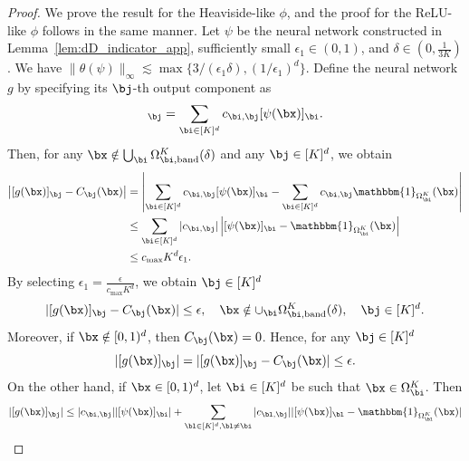 \documentclass[11pt]{article}
\begin{document}
\begin{proof}
     We prove the result for the Heaviside-like $\phi$, and the proof for the ReLU-like $\phi$ follows in the same manner. Let $\psi$ be the neural network constructed in Lemma~\ref{lem:dD_indicator_app}, sufficiently small $\epsilon_{1} \in (0,1)$, and $\delta \in (0,\tfrac{1}{3K})$. We have $\|\theta(\psi)\|_{\infty}\lesssim \max \{3 /(\epsilon_1\delta), (1/ \epsilon_1)^d\}$.
     Define the neural network $g$ by specifying its $\bj$-th output component as
    \begin{equation*}
        [g(\bx)]_{\bj} = \sum_{\bi \in [K]^d} c_{\bi, \bj} [\psi(\bx)]_{\bi}.
    \end{equation*}
    Then, for any $\bx \notin \bigcup_{\bi} \Omega_{\bi,\mathrm{band}}^{K}(\delta)$ and any $\bj\in[K]^d$, we obtain
    \begin{equation*}
        \begin{aligned}
            \left| [g(\bx)]_{\bj} -C_{\bj}(\bx) \right| & = \left| \sum_{\bi \in [K]^d} c_{\bi, \bj} [\psi(\bx)]_{\bi} -\sum_{\bi \in [K]^d} c_{\bi, \bj}\mathbbm{1}_{\Omega_{\bi}^K}(\bx) \right| \\
            & \leq \sum_{\bi \in [K]^d} |c_{\bi, \bj}|  \left| [\psi(\bx)]_{\bi} - \mathbbm{1}_{\Omega_{\bi}^K} (\bx ) \right| \\
            &\leq  c_{\max} K^{d} \epsilon_1.
        \end{aligned}
    \end{equation*}
    By selecting $\epsilon_{1} = \frac{\epsilon}{c_{\max} K^d}$, we obtain $\bj \in [K]^d$
    \begin{equation*}
        |[g(\bx)]_{\bj} - C_{\bj}(\bx)| \leq \epsilon, \quad \bx \notin \cup_{\bi} \Omega_{\bi, \mathrm{band}}^{K}(\delta),\quad \bj \in [K]^d.
    \end{equation*}
    Moreover, if $\bx \notin [0,1)^d$, then $C_{\bj}(\bx) = 0$. Hence, for any $\bj \in [K]^d$
    \begin{equation*}
        |[g(\bx)]_{\bj}| = |[g(\bx)]_{\bj} - C_{\bj}(\bx)| \leq \epsilon.
    \end{equation*}
    On the other hand, if $\bx \in [0,1)^d$, let $\bi\in[K]^d$ be such that $\bx \in \Omega_{\bi}^{K}$. Then 
    \begin{equation*}
        \begin{aligned}
            |[g(\bx)]_{\bj}| & \leq |c_{\bi, \bj}| |[\psi(\bx)]_{\bi}| + \sum_{\bl \in [K]^d, \bl \neq \bi} |c_{\bl, \bj}| |[\psi(\bx)]_{\bl} - \mathbbm{1}_{\Omega_{\bl}^K} (\bx)| \\

\end{aligned}
\end{equation*}
\end{proof}
\end{document}

